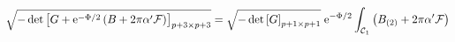 \begin{equation}
\sqrt{- \det \left[ G +  {\rm e}^{- \Phi/2} \left(B + 2 \pi \alpha'
{\cal F}\right)\right]_{p+3\times p+3} } = \sqrt{- \det
\left[G\right]_{p+1\times p+1} } \; {\rm e}^{- \Phi/2}  \int_{{\cal
C}_1} \left(B_{(2)} + 2 \pi \alpha' {\cal F}\right)
\end{equation}

